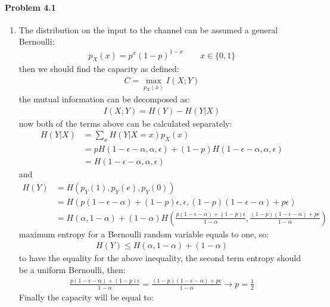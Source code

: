 \documentclass[12pt, letterpaper]{scrartcl}
\begin{document}
\paragraph*{Problem 4.1} \hfill\newline
\begin{enumerate}[((a))]
    \item
    The distribution on the input to the channel can be assumed a general Bernoulli:
    \begin{align*}
        p_{X}(x)=p^x(1-p)^{1-x}\qquad x\in\{0,1\}
    \end{align*}
    then we should find the capacity as defined:
    \begin{align*}
        C=\max_{p_{X}(x)} I(X;Y)
    \end{align*}
    the mutual information can be decomposed as:
    \begin{align*}
        I(X;Y)=H(Y)-H(Y|X)
    \end{align*}
    now both of the terms above can be calculated separately:
    \begin{align*}
        H(Y|X)&=\sum_x H(Y|X=x)p_{X}(x)\\
        &=pH(1-\epsilon-\alpha,\alpha,\epsilon) + (1-p)H(1-\epsilon-\alpha,\alpha,\epsilon)\\
        &=H(1-\epsilon-\alpha,\alpha,\epsilon)
    \end{align*}
    and
    \begin{align*}
        H(Y)&=H(p_{Y}(1),p_{Y}(e),p_{Y}(0))\\
        &=H(p(1-\epsilon-\alpha)+(1-p)\epsilon,\epsilon,(1-p)(1-\epsilon-\alpha)+p\epsilon)\\
        &=H(\alpha,1-\alpha) + (1-\alpha)H(\frac{p(1-\epsilon-\alpha)+(1-p)\epsilon}{1-\alpha}, \frac{(1-p)(1-\epsilon-\alpha)+p\epsilon}{1-\alpha})
    \end{align*}
    maximum entropy for a Bernoulli random variable equals to one, so:
    \begin{align*}
        H(Y)\leq H(\alpha,1-\alpha) + (1-\alpha)
    \end{align*}
    to have the equality for the above inequality, the second term entropy should be a uniform Bernoulli, then:
    \begin{align*}
        \frac{p(1-\epsilon-\alpha)+(1-p)\epsilon}{1-\alpha}=\frac{(1-p)(1-\epsilon-\alpha)+p\epsilon}{1-\alpha} \longrightarrow p=\frac{1}{2}
    \end{align*}
    Finally the capacity will be equal to:
    \begin{align*}

\end{align*}
\end{enumerate}
\end{document}
